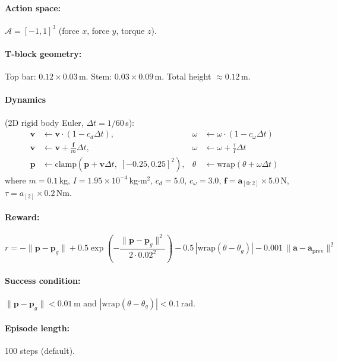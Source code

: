 \documentclass[11pt,a4paper]{article}
\newcommand{\cA}{\mathcal{A}}
\newcommand{\bvf}{\mathbf{v}}
\newcommand{\bpf}{\mathbf{p}}
\newcommand{\bff}{\mathbf{f}}
\newcommand{\ba}{\mathbf{a}}
\begin{document}
\paragraph{Action space:} $\cA = [-1, 1]^3$ (force $x$, force $y$, torque $z$).

\paragraph{T-block geometry:} Top bar: $0.12 \times 0.03$\,m. Stem: $0.03 \times 0.09$\,m. Total height $\approx 0.12$\,m.

\paragraph{Dynamics} (2D rigid body Euler, $\Delta t = 1/60$\,s):
\begin{align}
  \bvf &\leftarrow \bvf \cdot (1 - c_d \Delta t), & \omega &\leftarrow \omega \cdot (1 - c_\omega \Delta t) \\
  \bvf &\leftarrow \bvf + \frac{\bff}{m} \Delta t,  & \omega &\leftarrow \omega + \frac{\tau}{I} \Delta t \\
  \bpf &\leftarrow \text{clamp}\!\left(\bpf + \bvf \Delta t,\; [-0.25, 0.25]^2\right), & \theta &\leftarrow \text{wrap}(\theta + \omega \Delta t)
\end{align}
where $m = 0.1$\,kg, $I = 1.95 \times 10^{-4}$\,kg$\cdot$m$^2$, $c_d = 5.0$, $c_\omega = 3.0$, $\bff = \ba_{[0:2]} \times 5.0$\,N, $\tau = a_{[2]} \times 0.2$\,Nm.

\paragraph{Reward:}
\begin{equation}
  r = -\|\bpf - \bpf_g\| + 0.5\exp\!\left(-\frac{\|\bpf - \bpf_g\|^2}{2 \cdot 0.02^2}\right) - 0.5\,|\text{wrap}(\theta - \theta_g)| - 0.001\,\|\ba - \ba_{\text{prev}}\|^2
  \label{eq:pt_reward}
\end{equation}

\paragraph{Success condition:} $\|\bpf - \bpf_g\| < 0.01$\,m and $|\text{wrap}(\theta - \theta_g)| < 0.1$\,rad.

\paragraph{Episode length:} 100 steps (default).
\end{document}
